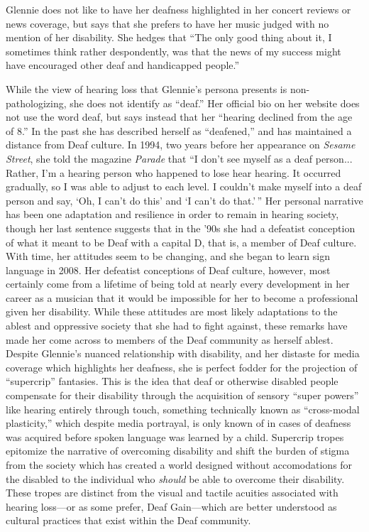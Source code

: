 \documentclass[12pt,letterpaper]{article}
\begin{document}
	Glennie does not like to have her deafness highlighted in her 
	concert reviews or news coverage, but says that she prefers to have her 
	music judged with no mention of her disability. She hedges that ``The 
	only good thing about it, I sometimes think rather despondently, was 
	that the news of my success might have encouraged other deaf and 
	handicapped people.''\autocite[59]{Glennie}

	While the view of hearing loss that Glennie's persona presents is 
	non-pathologizing, she does not identify as ``deaf.'' Her official bio
	on her website does not use the word deaf, but says instead that her 
	``hearing declined from the age of 8.'' In the past she has described 
	herself as ``deafened,'' and has maintained a distance from Deaf 
	culture. In 1994, two years before her appearance on 
	\textit{Sesame Street}, she told the magazine \textit{Parade} that 
	``I don't see
	myself as a deaf person... Rather, I'm a hearing person who happened to
	lose hear hearing. It occurred gradually, so I was able to adjust to 
	each level. I couldn't make myself into a deaf person and say, `Oh, I 
	can't do this' and `I can't do that.'\,'' Her personal narrative has 
	been one adaptation and resilience in order to remain in hearing 
	society, though her last sentence suggests that in the '90s she had a 
	defeatist conception of what it meant to be Deaf with a capital D, 
	that is, a member of Deaf culture. With time, her
	attitudes seem to be changing, and she began to learn sign language in 
	2008.\autocite[186]{Holmes} Her defeatist conceptions of Deaf culture, 
	however, most certainly come from a lifetime of being told at nearly 
	every development in her career as a musician that it would be 
	impossible for her to become a professional given her disability. While 
	these attitudes are most likely adaptations to the ablest and oppressive
	society that she had to fight against, these remarks have made her come
	across to members of the Deaf community as herself ablest. Despite 
	Glennie's nuanced relationship with disability, and her distaste for 
	media coverage which highlights her deafness, she is perfect fodder for 
	the projection of ``supercrip'' fantasies. This is the idea that deaf 	
	or otherwise disabled people compensate for their disability through the
	acquisition of sensory ``super powers'' like hearing entirely through 
	touch, something technically known as ``cross-modal plasticity,'' which 
	despite media portrayal, is only known of in cases of deafness was 
	acquired before spoken language was learned by a child. Supercrip 
	tropes epitomize the narrative of overcoming 
	disability and shift the burden of stigma from the society which has 
	created a world designed without accomodations for the disabled to the 
	individual
	who \textit{should} be able to overcome their disability. These tropes 
	are distinct from the visual and tactile acuities associated with 
	hearing loss---or as some prefer, Deaf 
	Gain\autocite[174]{Holmes}---which are better understood as cultural 
	practices that exist within the Deaf community.\autocite[181]{Holmes}
\end{document}
